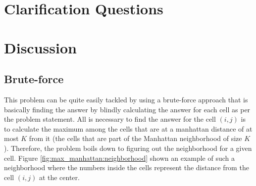 \section{Clarification Questions}

\begin{QandA}
	\item 
	\begin{answered}
		\textit{}
	\end{answered}
	
\end{QandA}

\section{Discussion}
\label{max_manhattan:sec:discussion}

\subsection{Brute-force}
\label{max_manhattan:sec:bruteforce}
This problem can be quite easily tackled by using a brute-force approach that is basically finding the answer 
by blindly calculating the answer for each cell as per the problem statement. 
All is necessary to find the answer for the cell $(i,j)$ is to calculate the maximum among the cells that are 
at a manhattan distance of at most $K$ from it (the cells that are part of the Manhattan
neighborhood of size $K$). Therefore, the problem boils down to figuring out  the neighborhood for a
given cell. Figure \ref{fig:max_manhattan:neighborhood} shown an example of such a neighborhood
where the numbers inside the cells represent the distance from the cell $(i,j)$ at the center. 
